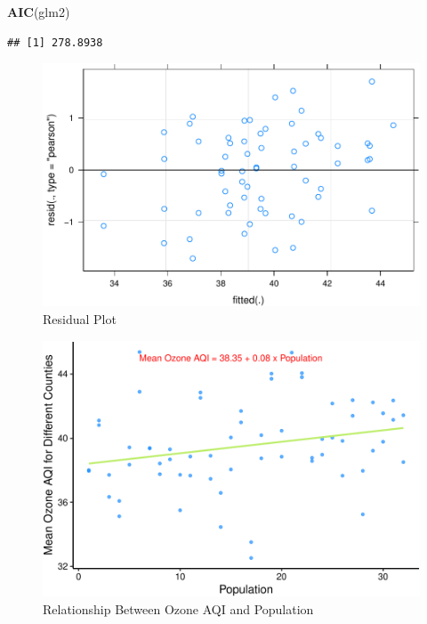 \documentclass[12pt,]{article}
\newenvironment{Shaded}{\begin{snugshade}}{\end{snugshade}}
\newcommand{\KeywordTok}[1]{\textcolor[rgb]{0.13,0.29,0.53}{\textbf{#1}}}
\newcommand{\NormalTok}[1]{#1}
\begin{document}
\begin{Shaded}
\begin{Highlighting}[]
\KeywordTok{AIC}\NormalTok{(glm2)}
\end{Highlighting}
\end{Shaded}

\begin{verbatim}
## [1] 278.8938
\end{verbatim}

\begin{figure}
\centering
\includegraphics{Xia_ENV_872_Project_files/figure-latex/Final visualization 5-1.pdf}
\caption{Residual Plot}
\end{figure}

\begin{figure}
\centering
\includegraphics{Xia_ENV_872_Project_files/figure-latex/Final visualization 4-1.pdf}
\caption{Relationship Between Ozone AQI and Population}
\end{figure}
\end{document}

